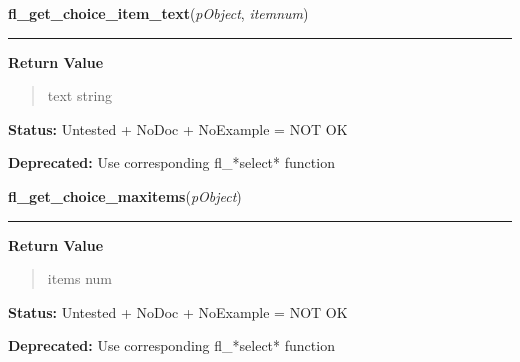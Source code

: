 \hspace{.8\funcindent}\begin{boxedminipage}{\funcwidth}

    \raggedright \textbf{fl\_get\_choice\_item\_text}(\textit{pObject}, \textit{itemnum})

    \vspace{-1.5ex}

    \rule{\textwidth}{0.5\fboxrule}
\setlength{\parskip}{2ex}
\setlength{\parskip}{1ex}
      \textbf{Return Value}
    \vspace{-1ex}

      \begin{quote}
      text string

      \end{quote}

\textbf{Status:} Untested + NoDoc + NoExample = NOT OK



\textbf{Deprecated:} Use corresponding fl\_*select* function



    \end{boxedminipage}

    \label{xformslib:deprecated:fl_get_choice_maxitems}

    \vspace{0.5ex}

\hspace{.8\funcindent}\begin{boxedminipage}{\funcwidth}

    \raggedright \textbf{fl\_get\_choice\_maxitems}(\textit{pObject})

    \vspace{-1.5ex}

    \rule{\textwidth}{0.5\fboxrule}
\setlength{\parskip}{2ex}
\setlength{\parskip}{1ex}
      \textbf{Return Value}
    \vspace{-1ex}

      \begin{quote}
      items num

      \end{quote}

\textbf{Status:} Untested + NoDoc + NoExample = NOT OK



\textbf{Deprecated:} Use corresponding fl\_*select* function



    \end{boxedminipage}

